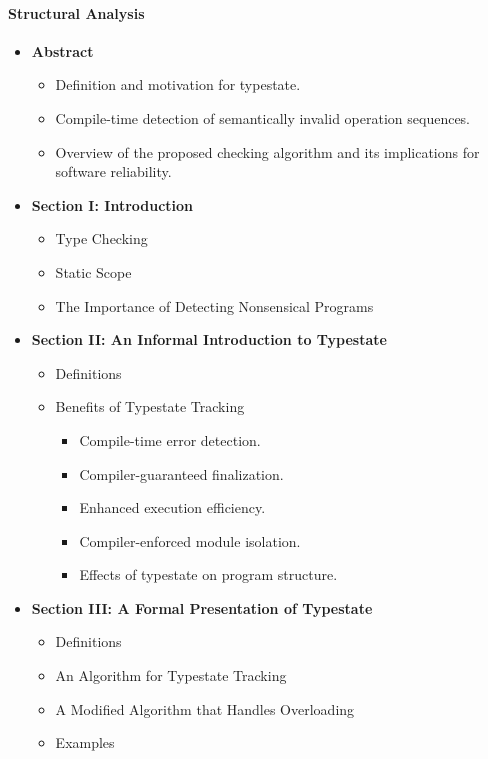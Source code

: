 \paragraph{Structural Analysis}
\begin{itemize}
    \item \textbf{Abstract}
    \begin{itemize}
        \item Definition and motivation for typestate.
        \item Compile-time detection of semantically invalid operation
        sequences.
        \item Overview of the proposed checking algorithm and its
        implications for software reliability.
    \end{itemize}

    \item \textbf{Section I: Introduction}
    \begin{itemize}
        \item Type Checking
        \item Static Scope
        \item The Importance of Detecting Nonsensical Programs
    \end{itemize}

    \item \textbf{Section II: An Informal Introduction to Typestate}
    \begin{itemize}
        \item Definitions
        \item Benefits of Typestate Tracking
        \begin{itemize}
            \item Compile-time error detection.
            \item Compiler-guaranteed finalization.
            \item Enhanced execution efficiency.
            \item Compiler-enforced module isolation.
            \item Effects of typestate on program structure.
        \end{itemize}
    \end{itemize}

    \item \textbf{Section III: A Formal Presentation of Typestate}
    \begin{itemize}
        \item Definitions
        \item An Algorithm for Typestate Tracking
        \item A Modified Algorithm that Handles Overloading
        \item Examples
    \end{itemize}


\end{itemize}
